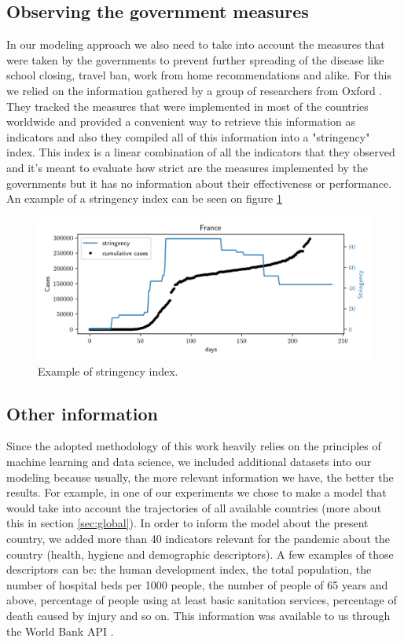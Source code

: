 \documentclass[12pt, letterpaper]{article}
\begin{document}
\subsection{Observing the government measures}\label{sec:stringency}

In our modeling approach we also need to take into account the measures that were taken by the governments to prevent further spreading of the disease like school closing, travel ban, work from home recommendations and alike. 
For this we relied on the information gathered by a group of researchers from Oxford \cite{stringency}. 
They tracked the measures that were implemented in most of the countries worldwide and provided a convenient way to retrieve this information as indicators and also they compiled all of this information into a "stringency" index. 
This index is a linear combination of all the indicators that they observed and it's meant to evaluate how strict are the measures implemented by the governments but it has no information about their effectiveness or performance. An example of a stringency index can be seen on figure \ref{fig:france_stringency}

\begin{figure}[h]
\centering
\includegraphics[scale=0.8]{france_stringency.png}
\caption{Example of stringency index.}
\label{fig:france_stringency}
\end{figure}

\subsection{Other information}\label{sec:worldbank}

Since the adopted methodology of this work heavily relies on the principles of machine learning and data science, we included additional datasets into our modeling because usually, the more relevant information we have, the better the results. 
For example, in one of our experiments we chose to make a model that would take into account the trajectories of all available countries (more about this in section \ref{sec:global}). 
In order to inform the model about the present country, we added more than 40 indicators relevant for the pandemic about the country (health, hygiene and demographic descriptors). 
A few examples of those descriptors can be: the human development index, the total population, the number of hospital beds per 1000 people, the number of people of 65 years and above, percentage of people using at least basic sanitation services, percentage of death caused by injury and so on.
This information was available to us through the World Bank API \cite{indicators}.
\end{document}
